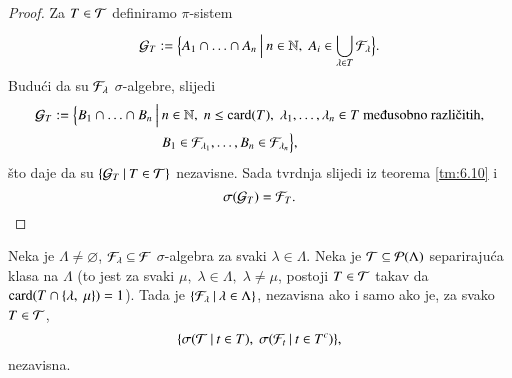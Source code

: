 \begin{proof}
    Za $T \in \mathcal{T}$ definiramo $\pi$-sistem
    \begin{equation*}
        \mathcal{G}_T := \Big\{{A_1 \cap \ldots \cap A_n} \: \Big| \: {n \in \mathbb{N}, \; A_i \in \bigcup\limits_{\lambda \in T}^{}\mathcal{F}_\lambda}\Big\}.
    \end{equation*}
    Budu\' ci da su $\mathcal{F}_\lambda$ $\sigma$-algebre, slijedi
    \begin{align*}
        \famG_T := \Big\{B_1 \cap \ldots \cap B_n \: \Big| \: &n \in \nat, \; n \leq \card{T}, \; \lambda_1, \ldots, \lambda_n \in T \textnormal{ me\dj usobno razli\v citih},\\ &B_1 \in \famF_{\lambda_1},\ldots, B_n \in \famF_{\lambda_n} \Big\},
    \end{align*}
    \v sto daje da su $\{{\mathcal{G}_T} \: | \: {T \in \mathcal{T}}\}$ nezavisne.
    Sada tvrdnja slijedi iz teorema \ref{tm:6.10} i
    \begin{equation*}
        \sigma({\mathcal{G}_T}) = \mathcal{F}_T.
    \end{equation*}
\end{proof}

\begin{prop}    \label{prop:6.12}
    Neka je $\Lambda \neq \varnothing$, $\mathcal{F}_\lambda \subseteq \mathcal{F}$ $\sigma$-algebra za svaki $\lambda \in \Lambda$.
    Neka je $\mathcal{T} \subseteq \mathcal{P}({\Lambda})$ separiraju\' ca klasa na $\Lambda$ (to jest za svaki $\mu, \; \lambda \in \Lambda, \; \lambda \neq \mu$, postoji $T \in \mathcal{T}$ takav da $\mathrm{card}({T \cap \{\lambda, \; \mu\}}) = 1$).
    Tada je $\{{\mathcal{F}_\lambda} \: | \: {\lambda \in \Lambda}\}$, nezavisna ako i samo ako je, za svako $T \in \mathcal{T}$,
    \begin{equation*}
        \{ \sigma({\mathcal{T}} \: | \: {t \in T}), \; \sigma({\mathcal{F}_t} \: | \: {t \in T^c}) \},
    \end{equation*}
    nezavisna.
\end{prop}

